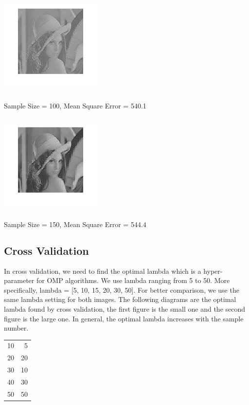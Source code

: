 \documentclass{article}
\begin{document}
\includegraphics[width=2in,height=2in]{2-100.png}
\vspace{-0.1in}

Sample Size = 100, Mean Square Error = 540.1

\includegraphics[width=2in,height=2in]{2-150.png}
\vspace{-0.1in}

Sample Size = 150, Mean Square Error = 544.4

\subsection{Cross Validation}

In cross validation, we need to find the optimal lambda which is a hyper-parameter for OMP algorithms. We use lambda ranging from 5 to 50. More specifically, lambda = [5, 10, 15, 20, 30, 50]. For better comparison, we use the same lambda setting for both images.
The following diagrams are the optimal lambda found by cross validation, the first figure is the small one and the second figure is the large one. In general, the optimal lambda increases with the sample number.

\vspace{1.5em}

\begin{tabular}{|r|r|}
	\hline
	\makecell{Samples} & \makecell{Lambda}  \\ \hline
	
	10 & 5 \\
	20 & 20 \\ 
	30 & 10 \\ 
	40 & 30 \\ 
	50 & 50 \\  
	\hline
	
\end{tabular}
\end{document}
